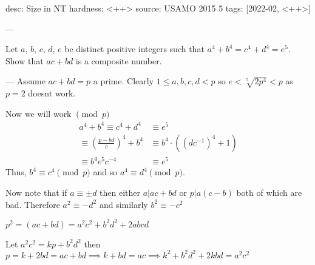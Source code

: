 desc: Size in NT
hardness: <++>
source: USAMO 2015 5
tags: [2022-02, <++>]

---

Let $a$, $b$, $c$, $d$, $e$ be distinct positive integers such that $a^4+b^4=c^4+d^4=e^5$. Show that $ac+bd$ is a composite number.

---
Assume $ac+bd = p$ a prime.
Clearly $1 \leq a,b,c,d < p$ so $e < \sqrt[5]{2p^4} < p$
as $p=2$ doesnt work.

Now we will work $\pmod{p}$
\begin{align*}
  a^4 + b^4 \equiv c^4 + d^4 &\equiv e^5 \\ 
  \equiv \left( \frac{p-bd}{c} \right)^4 + b^4 
  &\equiv b^4 \cdot ((d c^{-1})^4 + 1) \\
  \equiv b^4 e^5 c^{-4} &\equiv e^5
\end{align*}
Thus, $b^4 \equiv c^4 \pmod{p}$ and so $a^4 \equiv d^4 \pmod{p}$.

Now note that if $a \equiv \pm d$ then either $a|ac+bd$ or $p|a(c-b)$ 
both of which are bad. Therefore $a^2 \equiv -d^2$ and similarly $b^2 \equiv -c^2$


$p^2 = (ac+bd) = a^2c^2 + b^2d^2 + 2abcd$

Let $a^2c^2 = kp + b^2d^2$ then $p = k + 2bd = ac+bd \implies k + bd = ac \implies k^2 + b^2d^2 + 2kbd = a^2c^2 $
